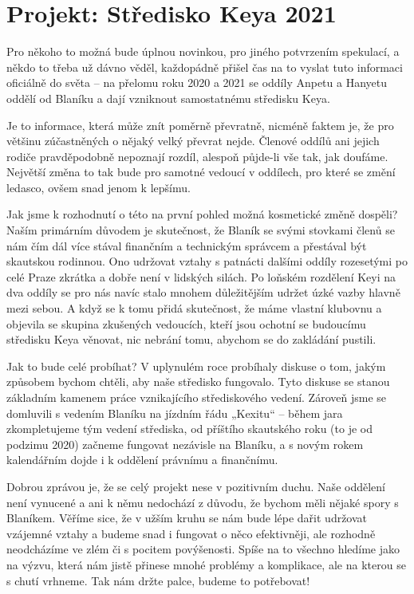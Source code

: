 \chapter{Projekt: Středisko Keya 2021} %
\label{cha:projekt_středisko_keya_2021}

Pro někoho to možná bude úplnou novinkou, pro jiného potvrzením spekulací, a někdo to třeba už dávno věděl, každopádně přišel čas na to vyslat tuto informaci oficiálně do světa – na přelomu roku 2020 a 2021 se oddíly Anpetu a Hanyetu oddělí od Blaníku a dají vzniknout samostatnému středisku Keya.

Je to informace, která může znít poměrně převratně, nicméně faktem je, že pro většinu zúčastněných o nějaký velký převrat nejde. Členové oddílů ani jejich rodiče pravděpodobně nepoznají rozdíl, alespoň půjde-li vše tak, jak doufáme. Největší změna to tak bude pro samotné vedoucí v oddílech, pro které se změní ledasco, ovšem snad jenom k lepšímu.

Jak jsme k rozhodnutí o této na první pohled možná kosmetické změně dospěli? Naším primárním důvodem je skutečnost, že Blaník se svými stovkami členů se nám čím dál více stával finančním a technickým správcem a přestával být skautskou rodinnou. Ono udržovat vztahy s patnácti dalšími oddíly rozesetými po celé Praze zkrátka a dobře není v lidských silách. Po loňském rozdělení Keyi na dva oddíly se pro nás navíc stalo mnohem důležitějším udržet úzké vazby hlavně mezi sebou. A když se k tomu přidá skutečnost, že máme vlastní klubovnu a objevila se skupina zkušených vedoucích, kteří jsou ochotní se budoucímu středisku Keya věnovat, nic nebrání tomu, abychom se do zakládání pustili.

Jak to bude celé probíhat? V uplynulém roce probíhaly diskuse o tom, jakým způsobem bychom chtěli, aby naše středisko fungovalo. Tyto diskuse se stanou základním kamenem práce vznikajícího střediskového vedení. Zároveň jsme se domluvili s vedením Blaníku na jízdním řádu „Kexitu“ – během jara zkompletujeme tým vedení střediska, od příštího skautského roku (to je od podzimu 2020) začneme fungovat nezávisle na Blaníku, a s novým rokem kalendářním dojde i k oddělení právnímu a finančnímu.

Dobrou zprávou je, že se celý projekt nese v pozitivním duchu. Naše oddělení není vynucené a ani k němu nedochází z důvodu, že bychom měli nějaké spory s Blaníkem. Věříme sice, že v užším kruhu se nám bude lépe dařit udržovat vzájemné vztahy a budeme snad i fungovat o něco efektivněji, ale rozhodně neodcházíme ve zlém či s pocitem povýšenosti. Spíše na to všechno hledíme jako na výzvu, která nám jistě přinese mnohé problémy a komplikace, ale na kterou se s chutí vrhneme. Tak nám držte palce, budeme to potřebovat!


\clearpage

